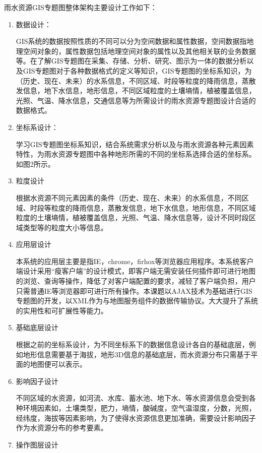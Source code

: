 雨水资源GIS专题图整体架构主要设计工作如下：
%
\begin{enumerate}
	
\item 	数据设计：

GIS系统的数据按照性质的不同可以分为空间数据和属性数据，空间数据指地理空间对象的，属性数据包括地理空间对象的属性以及其他相关联的业务数据等。在了解GIS专题图在采集、存储、分析、研究、图示为一体的数据分析以及GIS专题图对于各种数据格式的定义等知识，GIS专题图的坐标系知识，为（历史、现在、未来）的水系信息，不同区域、时段等粒度的降雨信息，蒸散发信息，地下水信息，地形信息，不同区域粒度的土壤墒情，植被覆盖信息，光照、气温、降水信息，交通信息等为所需设计的雨水资源专题图设计合适的数据格式。
\item 	坐标系设计：

学习GIS专题图坐标系知识，结合系统需求分析以及与雨水资源各种元素因素特性，为雨水资源专题图中各种地形所需的不同的坐标系选择合适的坐标系。如图2所示。
\item	粒度设计

根据水资源不同元素因素的条件（历史、现在、未来）的水系信息，不同区域、时段等粒度的降雨信息，蒸散发信息，地下水信息，地形信息，不同区域粒度的土壤墒情，植被覆盖信息，光照、气温、降水信息等，设计不同时段区域类型等的粒度大小等信息。
\item	应用层设计

本系统的应用层主要是指IE，chrome，firhox等浏览器应用程序。本系统客户端设计采用“瘦客户端”的设计模式，即客户端无需安装任何插件即可进行地图的浏览、查询等操作，降低了对客户端配置的要求，减轻了客户端负担，用户只需普通IE等浏览器即可进行所有操作。本课题以AJAX技术为基础进行GIS专题图的开发，以XML作为与地图服务组件的数据传输协议。大大提升了系统的实用性和可扩展性等能力。
\item	基础底层设计

根据之前的坐标系设计，为不同坐标系下的数据信息设计各自的基础底层，例如地形信息需要基于海拔，地形3D信息的基础底层，而水资源分布只需基于平面的地图便可以表示。
\item 	影响因子设计

不同区域的水资源，如河流、水库、蓄水池、地下水、等水资源信息会受到各
种环境因素如，土壤类型，肥力，墒情，酸碱度，空气温湿度，分数，光照，
经纬度，海拔等因素影响，为了使得水资源信息更加准确，需要设计影响因子
作为水资源分布的参考要素。
\item 	操作图层设计


\end{enumerate}
